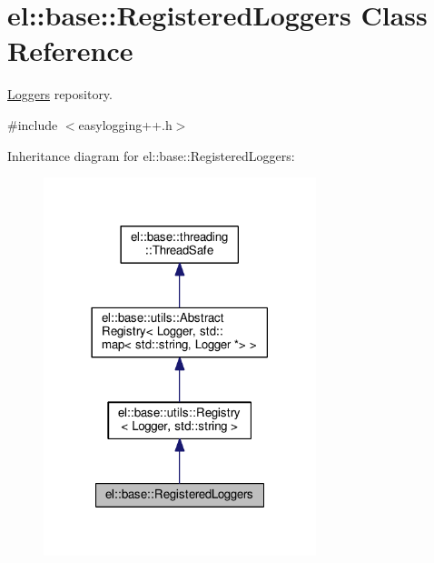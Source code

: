 \hypertarget{classel_1_1base_1_1_registered_loggers}{}\section{el\+:\+:base\+:\+:Registered\+Loggers Class Reference}
\label{classel_1_1base_1_1_registered_loggers}


\hyperlink{classel_1_1_loggers}{Loggers} repository.  




{\ttfamily \#include $<$easylogging++.\+h$>$}



Inheritance diagram for el\+:\+:base\+:\+:Registered\+Loggers\+:
\nopagebreak
\begin{figure}[H]
\begin{center}
\leavevmode
\includegraphics[width=225pt]{classel_1_1base_1_1_registered_loggers__inherit__graph}
\end{center}
\end{figure}


